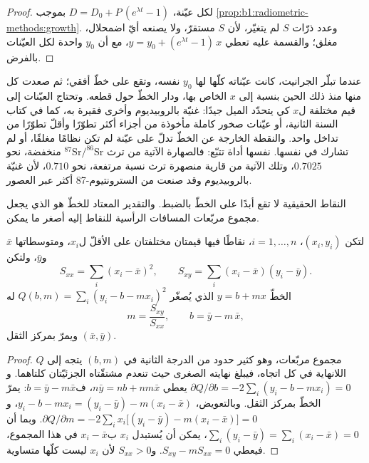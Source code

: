 \begin{proof}
لكل عيّنة، $D = D_0 + P\,(e^{\lambda t} - 1)$ بموجب \cref{prop:b1:radiometric-methods:growth}. وعدد ذرّات $S$ لم يتغيّر، لأن $S$ مستقرّ، ولا يصنعه أيّ اضمحلال،  مغلق؛ والقسمة عليه تعطي $y = y_0 + (e^{\lambda t} - 1)\,x$، مع أن $y_0$ واحدة لكل العيّنات بالفرض.
\end{proof}

عندما تبلّر الجرانيت، كانت عيّناته كلّها لها $y_0$ نفسه، وتقع على خطّ أفقي؛ ثم صعدت كل منها منذ ذلك الحين بنسبة إلى $x$ الخاص بها، ودار الخطّ حول قطعه. وتحتاج العيّنات إلى قيم مختلفة ل$x$ كي يتحدّد الميل جيدًا:  غنيّة بالروبيديوم وأخرى فقيرة به، كما في كتاب السنة الثانية، أو عيّنات صخور كاملة مأخوذة من أجزاء أكثر تطوّرًا وأقلّ تطوّرًا من تداخل واحد. والنقطة الخارجة عن الخطّ تدلّ على عيّنة لم تكن نظامًا مغلقًا، أو لم تشارك في  نفسها.  نفسها أداة تتبّع: فالصهارة الآتية من  ترث $^{87}\mathrm{Sr}/^{86}\mathrm{Sr}$ منخفضة، نحو $0.7025$، وتلك الآتية من  قارية منصهرة ترث نسبة مرتفعة، نحو $0.710$، لأن  غنيّة بالروبيديوم وقد صنعت من السترونتيوم-87 أكثر عبر العصور.

النقاط الحقيقية لا تقع أبدًا على الخطّ بالضبط. والتقدير المعتاد للخطّ هو الذي يجعل مجموع مربّعات المسافات الرأسية للنقاط إليه أصغر ما يمكن.

\begin{proposition}\label{prop:b1:radiometric-methods:lsq}
لتكن $(x_i, y_i)$، $i = 1, \dots, n$، نقاطًا فيها قيمتان مختلفتان على الأقلّ ل$x_i$، ومتوسطاتها $\bar x$ و$\bar y$، ولتكن
\[
  S_{xx} = \sum_i (x_i - \bar x)^2, \qquad S_{xy} = \sum_i (x_i - \bar x)(y_i - \bar y).
\]
الخطّ $y = b + m x$ الذي يُصغّر $Q(b, m) = \sum_i (y_i - b - m x_i)^2$ له
\[
  m = \frac{S_{xy}}{S_{xx}}, \qquad b = \bar y - m\,\bar x ,
\]
ويمرّ بمركز الثقل $(\bar x, \bar y)$.
\end{proposition}

\begin{proof}
$Q$ مجموع مربّعات، وهو كثير حدود من الدرجة الثانية في $(b, m)$ يتجه إلى اللانهاية في كل اتجاه، فيبلغ نهايته الصغرى حيث تنعدم مشتقّتاه الجزئيّتان كلتاهما. و$\partial Q/\partial b = -2 \sum_i (y_i - b - m x_i) = 0$ يعطي $n\bar y = n b + n m \bar x$، ف$b = \bar y - m \bar x$: يمرّ الخطّ بمركز الثقل. وبالتعويض، $y_i - b - m x_i = (y_i - \bar y) - m(x_i -
\bar x)$، و$\partial Q/\partial m = -2 \sum_i x_i \bigl[(y_i - \bar y) - m(x_i
- \bar x)\bigr] = 0$. وبما أن $\sum_i (y_i - \bar y) = \sum_i (x_i - \bar x) = 0$، يمكن أن يُستبدل $x_i$ ب$x_i - \bar x$ في هذا المجموع، فيعطي $S_{xy} - m S_{xx} = 0$. و$S_{xx} > 0$ لأن $x_i$ ليست كلّها متساوية.
\end{proof}

